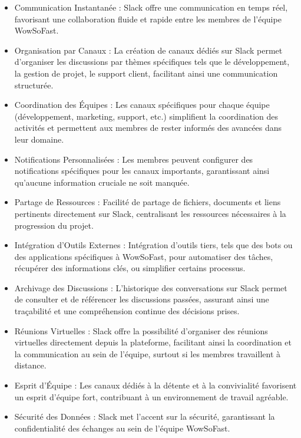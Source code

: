\begin{itemize}
  \item Communication Instantanée : Slack offre une communication en temps réel, favorisant une collaboration fluide et rapide entre les membres de l'équipe WowSoFast.

  \item Organisation par Canaux : La création de canaux dédiés sur Slack permet d'organiser les discussions par thèmes spécifiques tels que le développement, la gestion de projet, le support client, facilitant ainsi une communication structurée.

  \item Coordination des Équipes : Les canaux spécifiques pour chaque équipe (développement, marketing, support, etc.) simplifient la coordination des activités et permettent aux membres de rester informés des avancées dans leur domaine.

  \item Notifications Personnalisées : Les membres peuvent configurer des notifications spécifiques pour les canaux importants, garantissant ainsi qu'aucune information cruciale ne soit manquée.

  \item Partage de Ressources : Facilité de partage de fichiers, documents et liens pertinents directement sur Slack, centralisant les ressources nécessaires à la progression du projet.

  \item Intégration d'Outils Externes : Intégration d'outils tiers, tels que des bots ou des applications spécifiques à WowSoFast, pour automatiser des tâches, récupérer des informations clés, ou simplifier certains processus.

  \item Archivage des Discussions : L'historique des conversations sur Slack permet de consulter et de référencer les discussions passées, assurant ainsi une traçabilité et une compréhension continue des décisions prises.

  \item Réunions Virtuelles : Slack offre la possibilité d'organiser des réunions virtuelles directement depuis la plateforme, facilitant ainsi la coordination et la communication au sein de l'équipe, surtout si les membres travaillent à distance.

  \item Esprit d'Équipe : Les canaux dédiés à la détente et à la convivialité favorisent un esprit d'équipe fort, contribuant à un environnement de travail agréable.

  \item Sécurité des Données : Slack met l'accent sur la sécurité, garantissant la confidentialité des échanges au sein de l'équipe WowSoFast.
\end{itemize}

